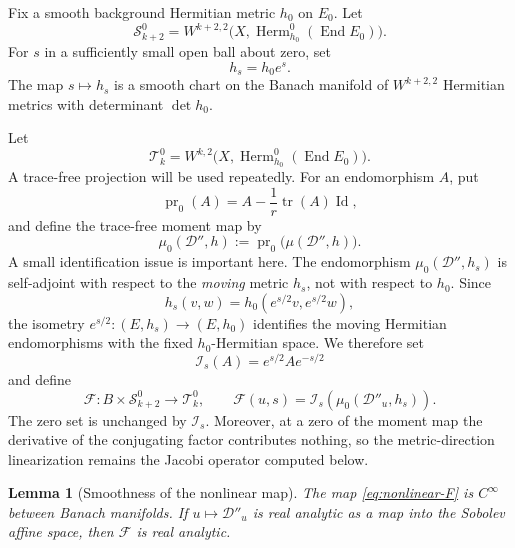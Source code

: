 \documentclass[11pt,reqno]{amsart}
\newtheorem{lemma}[theorem]{Lemma}
\theoremstyle{definition}
\theoremstyle{remark}
\newcommand{\cD}{\mathcal D}
\newcommand{\cF}{\mathcal F}
\newcommand{\cS}{\mathcal S}
\newcommand{\cT}{\mathcal T}
\newcommand{\End}{\operatorname{End}}
\newcommand{\Herm}{\operatorname{Herm}}
\newcommand{\Id}{\operatorname{Id}}
\newcommand{\tr}{\operatorname{tr}}
\begin{document}
Fix a smooth background Hermitian metric $h_0$ on $E_0$.  Let
\[
  \cS_{k+2}^0
  =W^{k+2,2}\bigl(X,\Herm^0_{h_0}(\End E_0)\bigr).
\]
For $s$ in a sufficiently small open ball about zero, set
\[
  h_s=h_0e^s.
\]
The map $s\mapsto h_s$ is a smooth chart on the Banach manifold of $W^{k+2,2}$ Hermitian metrics with determinant $\det h_0$.

Let
\[
  \cT_k^0
  =W^{k,2}\bigl(X,\Herm^0_{h_0}(\End E_0)\bigr).
\]
A trace-free projection will be used repeatedly.  For an endomorphism $A$, put
\begin{equation}\label{eq:tracefree-projection}
  \operatorname{pr}_0(A)
  =A-\frac1r\tr(A)\Id,
\end{equation}
and define the trace-free moment map by
\begin{equation}\label{eq:tracefree-moment-map}
  \mu_0(\cD'',h)
  :=\operatorname{pr}_0\bigl(\mu(\cD'',h)\bigr).
\end{equation}
A small identification issue is important here.  The endomorphism $\mu_0(\cD'',h_s)$ is self-adjoint with respect to the \emph{moving} metric $h_s$, not with respect to $h_0$.  Since
\[
  h_s(v,w)=h_0(e^{s/2}v,e^{s/2}w),
\]
the isometry $e^{s/2}:(E,h_s)\to(E,h_0)$ identifies the moving Hermitian endomorphisms with the fixed $h_0$-Hermitian space.  We therefore set
\[
  \mathcal I_s(A)=e^{s/2}Ae^{-s/2}
\]
and define
\begin{equation}\label{eq:nonlinear-F}
  \cF:B\times\cS_{k+2}^0\longrightarrow\cT_k^0,
  \qquad
  \cF(u,s)=\mathcal I_s\!\left(\mu_0(\cD''_u,h_s)\right).
\end{equation}
The zero set is unchanged by $\mathcal I_s$.  Moreover, at a zero of the moment map the derivative of the conjugating factor contributes nothing, so the metric-direction linearization remains the Jacobi operator computed below.

\begin{lemma}[Smoothness of the nonlinear map]\label{lem:F-smooth}
The map \eqref{eq:nonlinear-F} is $C^\infty$ between Banach manifolds.  If $u\mapsto\cD''_u$ is real analytic as a map into the Sobolev affine space, then $\cF$ is real analytic.
\end{lemma}
\end{document}
